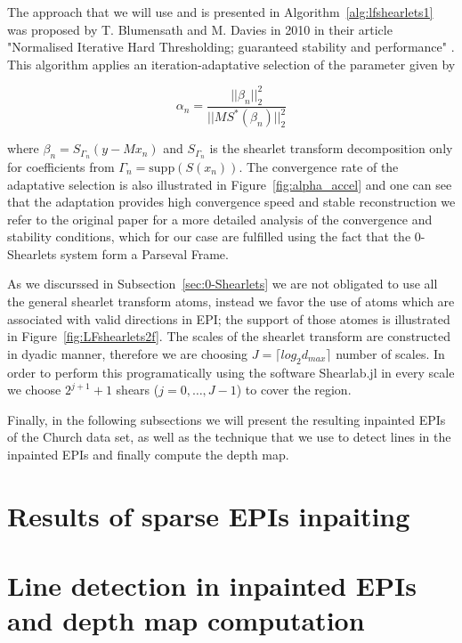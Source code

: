 The approach that we will use and is presented in Algorithm~\ref{alg:lfshearlets1} was proposed by T. Blumensath and M. Davies in 2010 in their article "Normalised Iterative Hard Thresholding; guaranteed stability and performance" \cite{hard-thresholding}. This algorithm applies an iteration-adaptative selection of the parameter given by

$$
\alpha_n=\frac{||\beta_n||_2^2}{||MS^*(\beta_n)||_2^2}
$$

where $\beta_n=S_{\Gamma_n}(y-Mx_n)$ and $S_{\Gamma_n}$ is the shearlet transform decomposition only for coefficients from $\Gamma_n=\textrm{supp}(S(x_n))$. The convergence rate of the adaptative selection is also illustrated in Figure~\ref{fig:alpha_accel} and one can see that the adaptation provides high convergence speed and stable reconstruction we refer to the original paper \cite{hard-thresholding} for a more detailed analysis of the convergence and stability conditions, which for our case are fulfilled using the fact that the $0$-Shearlets system form a Parseval Frame. 

\bigskip

As we discurssed in Subsection~\ref{sec:0-Shearlets} we are not obligated to use all the general shearlet transform atoms, instead we favor the use of atoms which are associated with valid directions in EPI; the support of those atomes is illustrated in Figure~\ref{fig:LFshearlets2f}. The scales of the shearlet transform are constructed in dyadic manner, therefore we are choosing $J = \lceil log_2 d_{max}\rceil$ number of scales. In order to perform this programatically using the software Shearlab.jl in every scale we choose $2^{j+1}+1$ shears ($j=0,\ldots, J-1$) to cover the region.

\bigskip

Finally, in the following subsections we will present the resulting inpainted EPIs of the Church data set, as well as the technique that we use to detect lines in the inpainted EPIs and finally compute the depth map. 

\section{Results of sparse EPIs inpaiting}


\section{Line detection in inpainted EPIs and depth map computation}

